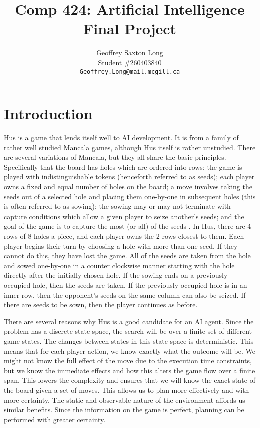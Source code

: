 \documentclass[]{article}
\title{Comp 424: Artificial Intelligence \\ Final Project}
\author{Geoffrey Saxton Long\\
Student \#260403840 \\
{\tt\small Geoffrey.Long@mail.mcgill.ca}
}
\begin{document}
\maketitle

\newpage
\section{Introduction}
Hus is a game that lends itself well to AI development. It is from a family of rather well studied Mancala games, although Hus itself is rather unstudied. There are several variations of Mancala, but they all share the basic principles. Specifically that the board has holes which are ordered into rows; the game is played with indistinguishable tokens (henceforth referred to as seeds); each player owns a fixed and equal number of holes on the board; a move involves taking the seeds out of a selected hole and placing them one-by-one in subsequent holes (this is often referred to as sowing); the sowing may or may not terminate with capture conditions which allow a given player to seize another's seeds; and the goal of the game is to capture the most (or all) of the seeds \cite{donkers2002programming}. In Hus, there are 4 rows of 8 holes a piece, and each player owns the 2 rows closest to them. Each player begins their turn by choosing a hole with more than one seed. If they cannot do this, they have lost the game. All of the seeds are taken from the hole and sowed one-by-one in a counter clockwise manner starting with the hole directly after the initially chosen hole. If the sowing ends on a previously occupied hole, then the seeds are taken. If the previously occupied hole is in an inner row, then the opponent's seeds on the same column can also be seized. If there are seeds to be sown, then the player continues as before.

There are several reasons why Hus is a good candidate for an AI agent. Since the problem has a discrete state space, the search will be over a finite set of different game states. The changes between states in this state space is deterministic. This means that for each player action, we know exactly what the outcome will be. We might not know the full effect of the move due to the execution time constraints, but we know the immediate effects and how this alters the game flow over a finite span. This lowers the complexity and ensures that we will know the exact state of the board given a set of moves. This allows us to plan more effectively and with more certainty. The static and observable nature of the environment affords us similar benefits. Since the information on the game is perfect, planning can be performed with greater certainty. 
\end{document}
